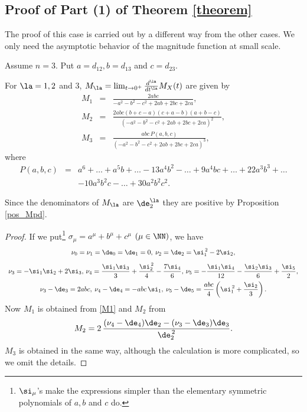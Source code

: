 \subsection{Proof of Part (1) of Theorem \ref{theorem}}\label{part1} 
%
The proof of this case is carried out by a different way from the other cases. 
We only need the asymptotic behavior of the magnitude function at small scale. 

Assume $n=3$. Put $a=d_{12}, b=d_{13}$ and $c=d_{23}$. 
%
\begin{lemma}\label{lemma_Mu_Md}
For $\la=1,2$ and $3$, $M_\la=\lim_{t\to 0^+}\frac{d^\la}{dt^\la}M_X(t)$ are given by 
\[
\begin{array}{rcl}
M_1&=&\displaystyle \frac{2abc}{-a^2-b^2-c^2+2ab+2bc+2ca}, \\[6mm]
%
M_2&=&\displaystyle \frac{2abc(b+c-a)(c+a-b)(a+b-c)}{{(-a^2-b^2-c^2+2ab+2bc+2ca)}^2}, \\[6mm]
%
M_3&=&\displaystyle \frac{abc\,P(a,b,c)}{{(-a^2-b^2-c^2+2ab+2bc+2ca)}^3},
\end{array}
\]
where 
\[\begin{array}{rcl}
P(a,b,c)&=&\displaystyle a^6+\dots+a^5b+\dots-13a^4b^2-\dots+9a^4bc+\dots+22a^3b^3+\dots \\[2mm]
%
&&\displaystyle -10a^3b^2c-\dots+30a^2b^2c^2.
\end{array}
\]
\end{lemma}

Since the denominators of $M_\la$ are $\de_{2}^{\la}$ they are positive by Proposition \ref{pos_Mpd}. 

\begin{proof}
If we put\footnote{$\si_\mu$'s make the expressions simpler than the elementary symmetric polynomials of $a,b$ and $c$ do. } $\sigma_\mu=a^\mu+b^\mu+c^\mu$ $(\mu\in\NN)$, we have 
%
\[\begin{array}{c}
\nu_0=\nu_1=\de_0=\de_1=0,\> \nu_2=\de_2=\si_1^{\,2}-2\si_2,\\[3mm]
%
\displaystyle \nu_3=-\si_1\si_2+2\si_3, \, \nu_4=\frac{\si_1\si_3}3+\frac{\si_2^{\,2}}4-\frac{7\si_4}6, \, \nu_5=-\frac{\si_1\si_4}{12}-\frac{\si_2\si_3}6+\frac{\si_5}2,\\[3mm]
%
\displaystyle \nu_3-\de_3=2abc, \> \nu_4-\de_4=-abc\,\si_1, \> \nu_5-\de_5=\frac{abc}4\left(\si_1^{\,2}+\frac{\si_2}3\right).
\end{array}\]
%
Now $M_1$ is obtained from \eqref{M1} and $M_2$ from 
\[
M_2=2\,\frac{(\nu_4-\de_4)\de_2-(\nu_3-\de_3)\de_3}{\de_{2}^{\,2}}.
\]
$M_3$ is obtained in the same way, although the calculation is more complicated, so we omit the details. 
\end{proof}



